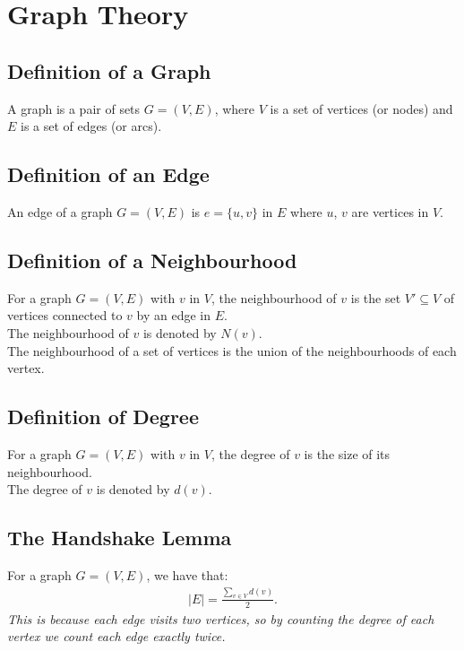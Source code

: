 \documentclass[a4paper, 12pt, twoside]{article}
\begin{document}
\vfill

\section{Graph Theory}

\subsection{Definition of a Graph}

A graph is a pair of sets $G = (V, E)$, where $V$ is a set of 
vertices (or nodes) and $E$ is a set of edges (or arcs).

\subsection{Definition of an Edge}

An edge of a graph $G = (V, E)$ is $e = \{u, v\}$ in $E$ where $u$,
$v$ are vertices in $V$.

\subsection{Definition of a Neighbourhood}

For a graph $G = (V, E)$ with $v$ in $V$, the neighbourhood
of $v$ is the set $V' \subseteq V$ of vertices connected to
$v$ by an edge in $E$.
\\[\baselineskip]
The neighbourhood of $v$ is denoted by $N(v)$.
\\[\baselineskip]
The neighbourhood of a set of vertices is the union of
the neighbourhoods of each vertex.

\subsection{Definition of Degree}

For a graph $G = (V, E)$ with $v$ in $V$, the degree of $v$
is the size of its neighbourhood.
\\[\baselineskip]
The degree of $v$ is denoted by $d(v)$.

\subsection{The Handshake Lemma}

For a graph $G = (V, E)$, we have that: \begin{gather*}
  |E| = \frac{\sum_{v \in V} d(v)}{2}.
\end{gather*} \textit{This is because each edge visits two vertices,
so by counting the degree of each vertex we count each edge exactly
twice.}
\end{document}
